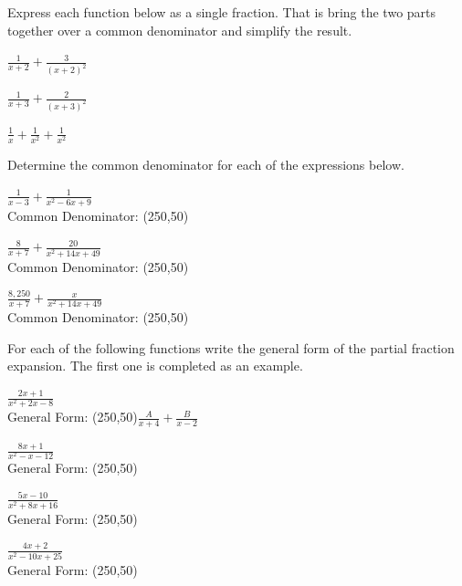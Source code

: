 
\begin{problem}
\item Express each function below as a single fraction. That is bring
  the two parts together over a common denominator and simplify the
  result.
  \begin{subproblem}
  \item $\frac{1}{x+2} + \frac{3}{(x+2)^2}$
    \vfill
  \item $\frac{1}{x+3} + \frac{2}{(x+3)^2}$
    \vfill
  \item $\frac{1}{x} + \frac{1}{x^2} + \frac{1}{x^2}$
    \vfill
  \end{subproblem}
\end{problem}

\begin{problem}
\item Determine the common denominator for each of the expressions below.
  \begin{subproblem}
    \item $\frac{1}{x-3} + \frac{1}{x^2-6x+9}$ \\
      Common Denominator: \framebox(250,50){~}
      \vfill
    \item $\frac{8}{x+7} + \frac{20}{x^2+14x+49}$ \\
      Common Denominator: \framebox(250,50){~}
      \vfill
    \item $\frac{8,250}{x+7} + \frac{x}{x^2+14x+49}$ \\
      Common Denominator: \framebox(250,50){~}
      \vfill
  \end{subproblem}

  \clearpage

\item For each of the following functions write the general form of
  the partial fraction expansion. The first one is completed as an
  example.
  \begin{subproblem}
    \item $\frac{2x+1}{x^2+2x-8}$ \\
      General Form: \framebox(250,50){$\frac{A}{x+4} + \frac{B}{x-2}$}
      \vfill
    \item $\frac{8x+1}{x^2-x-12}$ \\
      General Form: \framebox(250,50){~}
      \vfill
    \item $\frac{5x-10}{x^2+8x+16}$ \\
      General Form: \framebox(250,50){~}
      \vfill
    \item $\frac{4x+2}{x^2-10x+25}$ \\
      General Form: \framebox(250,50){~}
      \vfill
  \end{subproblem}

\end{problem}


